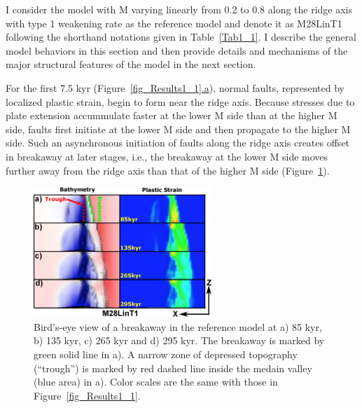 I consider the model with M varying linearly from 0.2 to 0.8 along the ridge axis with type 1 weakening rate as the reference model and denote it as M28LinT1 following the shorthand notations given in Table~\hyperref[Tab1_1]{\ref{Tab1_1}}. I describe the general model behaviors in this section and then provide details and mechanisms of the major structural features of the model in the next section.

For the first 7.5 kyr (Figure~\hyperref[fig_Results1_1]{\ref{fig_Results1_1}.a}), %
normal faults, represented by localized plastic strain, begin to form near the ridge axis.
Because stresses due to plate extension accummulate faster at the lower M side than at the higher M side, faults first initiate at the lower M side and then propagate to the higher M side. Such an asynchronous initiation of faults along the ridge axis creates offset in breakaway at later stages, i.e., the breakaway at the lower M side moves further away from the ridge axis than that of the higher M side (Figure~\hyperref[fig_Results1_4]{\ref{fig_Results1_4}}).

\begin{figure}[h]
   \centering
     \includegraphics[width=0.6\textwidth]{./Figures/fig_Results1_4.eps}
   \caption[Bird's-eye view of a breakaway in the reference model.]{Bird's-eye view of a breakaway in the reference model at a) 85 kyr, b) 135 kyr, c) 265 kyr and d) 295 kyr. The breakaway is marked by green solid line in a). A narrow zone of depressed topography (``trough'') is marked by red dashed line inside the medain valley (blue area) in a). Color scales are the same with those in Figure~\hyperref[fig_Results1_1]{\ref{fig_Results1_1}}.}
  \label{fig_Results1_4}
\end{figure}


